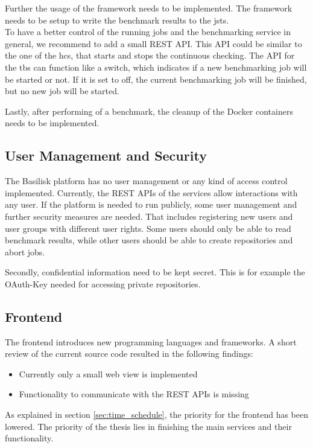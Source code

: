 Further the usage of the \iguana{} framework needs to be implemented.
The framework needs to be setup to write the benchmark results to the \acl{jsts}.
\\

To have a better control of the running jobs and the benchmarking service in general, we recommend to add a small REST API.
This API could be similar to the one of the \ac{hcs}, that starts and stops the continuous checking.
The API for the \ac{tbs} can function like a switch, which indicates if a new benchmarking job will be started or not.
If it is set to off, the current benchmarking job will be finished, but no new job will be started.

Lastly, after performing of a benchmark, the cleanup of the Docker containers needs to be implemented.

\subsection{User Management and Security}
\label{sec:review_user_management}
The Basilisk platform has no user management or any kind of access control implemented.
Currently, the REST APIs of the services allow interactions with any user.
If the platform is needed to run publicly, some user management and further security measures are needed.
That includes registering new users and user groups with different user rights.
Some users should only be able to read benchmark results, while other users should be able to create repositories and abort jobs.

Secondly, confidential information need to be kept secret.
This is for example the OAuth-Key needed for accessing private \gh{} repositories.


\subsection{Frontend}
\label{sec:review_frontend}
The frontend introduces new programming languages and frameworks.
A short review of the current source code resulted in the following findings:
\begin{itemize}
	\item Currently only a small web view is implemented
	\item Functionality to communicate with the REST APIs is missing
\end{itemize}


As explained in section \ref{sec:time_schedule}, the priority for the frontend has been lowered.
The priority of the thesis lies in finishing the main services and their functionality.

